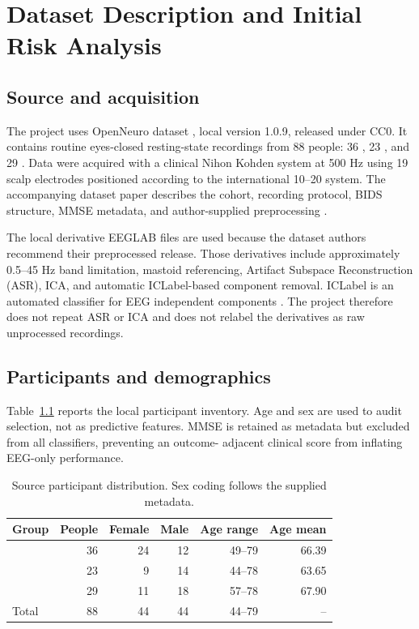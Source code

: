 \chapter{Dataset Description and Initial Risk Analysis}
\label{ch:dataset}

\section{Source and acquisition}

The project uses OpenNeuro dataset , local version 1.0.9, released
under CC0. It contains routine eyes-closed resting-state recordings from 88
people: 36 \AD{}, 23 \FTD{}, and 29 \CN{}. Data were acquired with a clinical
Nihon Kohden system at 500 Hz using 19 scalp electrodes positioned according to
the international 10--20 system. The accompanying dataset paper describes the
cohort, recording protocol, BIDS structure, MMSE metadata, and author-supplied
preprocessing \citep{miltiadous2023dataset,openneuro2026dataset}.

The local derivative EEGLAB files are used because the dataset authors recommend
their preprocessed release. Those derivatives include approximately 0.5--45 Hz
band limitation, mastoid referencing, Artifact Subspace Reconstruction (ASR),
ICA, and automatic ICLabel-based component removal. ICLabel is an automated
classifier for EEG independent components \citep{piontonachini2019iclabel}. The
project therefore does not repeat ASR or ICA and does not relabel the derivatives
as raw unprocessed recordings.

\section{Participants and demographics}

Table~\ref{tab:source-demographics} reports the local participant inventory.
Age and sex are used to audit selection, not as predictive features. MMSE is
retained as metadata but excluded from all classifiers, preventing an outcome-
adjacent clinical score from inflating EEG-only performance.

\begin{table}[htbp]
\centering
\begin{tabular}{lrrrrr}
\toprule
\textbf{Group} & \textbf{People} & \textbf{Female} & \textbf{Male} & \textbf{Age range} & \textbf{Age mean}\\
\midrule
\AD{} & 36 & 24 & 12 & 49--79 & 66.39\\
\FTD{} & 23 & 9 & 14 & 44--78 & 63.65\\
\CN{} & 29 & 11 & 18 & 57--78 & 67.90\\
\midrule
Total & 88 & 44 & 44 & 44--79 & --\\
\bottomrule
\end{tabular}
\caption{Source participant distribution. Sex coding follows the supplied metadata.}
\label{tab:source-demographics}
\end{table}

